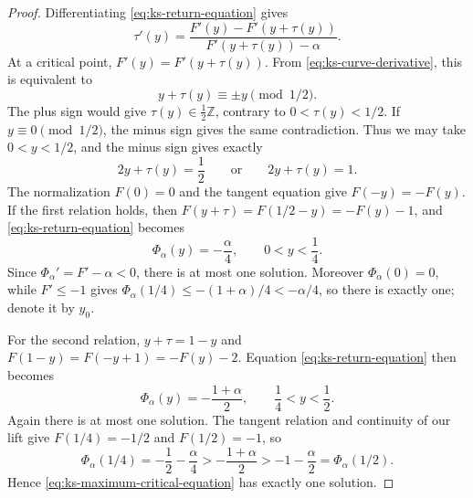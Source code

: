 \documentclass[11pt,reqno,a4paper]{amsart}
\numberwithin{equation}{section}
\theoremstyle{compact}
\theoremstyle{definition}
\theoremstyle{definition}
\begin{document}
\begin{proof}
Differentiating \eqref{eq:ks-return-equation} gives
\begin{equation}\label{eq:ks-return-derivative}
  \tau'(y)
  =\frac{F'(y)-F'(y+\tau(y))}
         {F'(y+\tau(y))-\alpha}.
\end{equation}
At a critical point,
$F'(y)=F'(y+\tau(y))$.  From \eqref{eq:ks-curve-derivative}, this is equivalent
to
\[
  y+\tau(y)\equiv \pm y\pmod{1/2}.
\]
The plus sign would give $\tau(y)\in\frac12\mathbb Z$, contrary to
$0<\tau(y)<1/2$.  If $y\equiv0\pmod{1/2}$, the minus sign gives the same
contradiction.  Thus we may take $0<y<1/2$, and the minus sign gives exactly
\begin{equation}\label{eq:ks-critical-point-relations}
  2y+\tau(y)=\frac12
  \qquad\text{or}\qquad
  2y+\tau(y)=1.
\end{equation}
The normalization $F(0)=0$ and the tangent equation give $F(-y)=-F(y)$.
If the first relation holds, then
$F(y+\tau)=F(1/2-y)=-F(y)-1$, and
\eqref{eq:ks-return-equation} becomes
\begin{equation}\label{eq:ks-minimum-critical-equation}
  \Phi_\alpha(y)=-\frac{\alpha}{4},
  \qquad 0<y<\frac14.
\end{equation}
Since $\Phi_\alpha'=F'-\alpha<0$, there is at most one solution.  Moreover
$\Phi_\alpha(0)=0$, while $F'\leq-1$ gives
$\Phi_\alpha(1/4)\leq-(1+\alpha)/4<-\alpha/4$, so there is exactly one;
denote it by $y_0$.

For the second relation, $y+\tau=1-y$ and
$F(1-y)=F(-y+1)=-F(y)-2$.  Equation
\eqref{eq:ks-return-equation} then becomes
\begin{equation}\label{eq:ks-maximum-critical-equation}
  \Phi_\alpha(y)=-\frac{1+\alpha}{2},
  \qquad \frac14<y<\frac12.
\end{equation}
Again there is at most one solution.  The tangent relation and continuity of
our lift give $F(1/4)=-1/2$ and $F(1/2)=-1$, so
\[
  \Phi_\alpha(1/4)=-\frac12-\frac\alpha4
  >-\frac{1+\alpha}{2}
  >-1-\frac\alpha2=\Phi_\alpha(1/2).
\]
Hence \eqref{eq:ks-maximum-critical-equation} has exactly one solution.


\end{proof}
\end{document}

